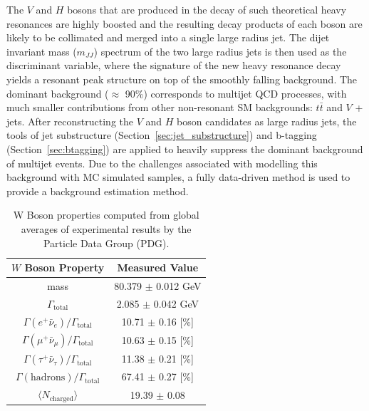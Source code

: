 The $V$ and $H$ bosons that are produced in the decay of such theoretical heavy resonances are highly boosted and the resulting decay products of each boson are likely to be collimated and merged into a single large radius jet.
The dijet invariant mass ($m_{JJ}$) spectrum of the two large radius jets is then used as the discriminant variable, where the signature of the new heavy resonance decay yields a resonant peak structure on top of the smoothly falling background.
The dominant background ($\approx$ 90\%) corresponds to multijet QCD processes, with much smaller contributions from other non-resonant SM backgrounds: $t\bar{t}$ and $V$ + jets.
After reconstructing the $V$ and $H$ boson candidates as large radius jets, the tools of jet substructure (Section~\ref{sec:jet_substructure}) and b-tagging (Section~\ref{sec:btagging}) are applied to heavily suppress the dominant background of multijet events.
Due to the challenges associated with modelling this background with MC simulated samples, a fully data-driven method is used to provide a background estimation method.

\begin{table}[!htb]
\begin{center}
\begin{tabular}{|c|c|}
\hline
$W$ Boson Property & Measured Value \\ \hline
mass & 80.379 $\pm$ 0.012 GeV \\
\hline
$\Gamma_{\mathrm{total}}$ & 2.085 $\pm$ 0.042 GeV \\
$\Gamma(e^+ \bar{\nu}_e) / \Gamma_{\mathrm{total}}$ & 10.71 $\pm$ 0.16 [\%]\\
$\Gamma(\mu^+ \bar{\nu}_\mu) / \Gamma_{\mathrm{total}}$ & 10.63 $\pm$ 0.15 [\%]\\
$\Gamma(\tau^+ \bar{\nu}_\tau) / \Gamma_{\mathrm{total}}$ & 11.38 $\pm$ 0.21 [\%]\\
$\Gamma(\mathrm{hadrons}) / \Gamma_{\mathrm{total}}$ & 67.41 $\pm$ 0.27 [\%]\\
\hline
$\langle N_{\mathrm{charged}} \rangle$ & 19.39 $\pm$ 0.08 \\
\hline
\end{tabular}
\caption{
W Boson properties computed from global averages of experimental results by the Particle Data Group (PDG). \cite{PDG:PhysRevD.98.030001}
}
\label{tab:w_props}
\end{center}
\end{table}

